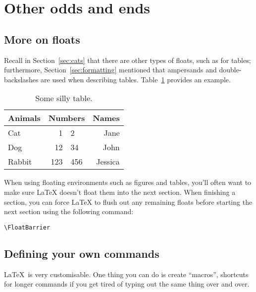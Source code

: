 \section{Other odds and ends}

\subsection{More on floats}

Recall in Section~\ref{sec:cats} that there are other types of floats,
such as for tables; furthermore, Section~\ref{sec:formatting}
mentioned that ampersands and double-backslashes are used when
describing tables.
Table~\ref{tab:example-table-1} provides an example.

\begin{table}
    \begin{center}
        \begin{tabular}{l|r@{.}l|r}
            Animals & \multicolumn{2}{|c|}{Numbers} & Names \\
            \hline\hline
            Cat     &    1&2                        & Jane  \\
            Dog     &   12&34                       & John  \\
            Rabbit  &  123&456                      & Jessica
        \end{tabular}
        \caption{Some silly table.}
        \label{tab:example-table-1}
    \end{center}
\end{table}

When using floating environments such as figures and tables,
you'll often want to make sure LaTeX doesn't float them into the next section.
When finishing a section, you can force LaTeX to flush out any remaining
floats before starting the next section using the following command:

\begin{verbatim}
\FloatBarrier
\end{verbatim}

\FloatBarrier


\subsection{Defining your own commands}

\LaTeX\ is very customisable.
One thing you can do is create ``macros'',
shortcuts for longer commands if you get tired of
typing out the same thing over and over.

